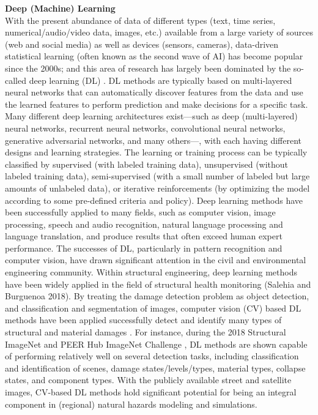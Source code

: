 \noindent\textbf{Deep (Machine) Learning} \\With the present abundance of data of different types (text, time series, numerical/audio/video data, images, etc.) available from a large variety of sources (web and social media) as well as devices (sensors, cameras), data-driven statistical learning (often known as the second wave of AI) has become popular since the 2000s; and this area of research has largely been dominated by the so-called deep learning (DL) \citep{lecun2015deep}. DL methods are typically based on multi-layered neural networks that can automatically discover features from the data and use the learned features to perform prediction and make decisions for a specific task. Many different deep learning architectures exist—such as deep (multi-layered) neural networks, recurrent neural networks, convolutional neural networks, generative adversarial networks, and many others—, with each having different designs and learning strategies. The learning or training process can be typically classified by supervised (with labeled training data), unsupervised (without labeled training data), semi-supervised (with a small number of labeled but large amounts of unlabeled data), or iterative reinforcements (by optimizing the model according to some pre-defined criteria and policy). Deep learning methods have been successfully applied to many fields, such as computer vision, image processing, speech and audio recognition, natural language processing and language translation, and produce results that often exceed human expert performance. The successes of DL, particularly in pattern recognition and computer vision, have drawn significant attention in the civil and environmental engineering community. Within structural engineering, deep learning methods have been widely applied in the field of structural health monitoring (Salehia and Burguenoa 2018). By treating the damage detection problem as object detection, and classification and segmentation of images, computer vision (CV) based DL methods have been applied successfully detect and identify many types of structural and material damages \citep{cha2017deep,ferguson2018detection,gao2018deep,yeum2019automated,enjani2020automated}. For instance, during the 2018 Structural ImageNet and PEER Hub ImageNet Challenge \citep{gao2018structural}, DL methods are shown capable of performing relatively well on several detection tasks, including classification and identification of scenes, damage states/levels/types, material types, collapse states, and component types. With the publicly available street and satellite images, CV-based DL methods hold significant potential for being an integral component in (regional) natural hazards modeling and simulations.

